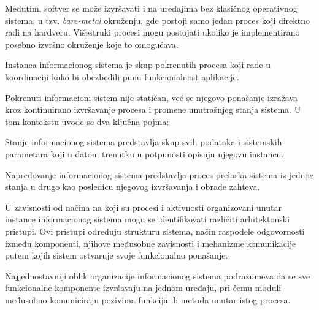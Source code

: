 Međutim, softver se može izvršavati i na uređajima bez klasičnog operativnog sistema, u tzv. \textit{bare-metal} okruženju, gde postoji samo jedan proces koji direktno radi na hardveru. Višestruki procesi mogu postojati ukoliko je implementirano posebno izvršno okruženje koje to omogućava.

\begin{definicija}
Instanca informacionog sistema je skup pokrenutih procesa koji rade u koordinaciji kako bi obezbedili punu funkcionalnost aplikacije.
\end{definicija}

Pokrenuti informacioni sistem nije statičan, već se njegovo ponašanje izražava kroz kontinuirano izvršavanje procesa i promene unutrašnjeg stanja sistema. U tom kontekstu uvode se dva ključna pojma:

\begin{definicija}
Stanje informacionog sistema predstavlja skup svih podataka i sistemskih parametara koji u datom trenutku u potpunosti opisuju njegovu instancu.
\end{definicija}

\begin{definicija}
Napredovanje informacionog sistema predstavlja proces prelaska sistema iz jednog stanja u drugo kao posledicu njegovog izvršavanja i obrade zahteva.
\end{definicija}

U zavisnosti od načina na koji su procesi i aktivnosti organizovani unutar instance informacionog sistema mogu se identifikovati različiti arhitektonski pristupi. Ovi pristupi određuju strukturu sistema, način raspodele odgovornosti između komponenti, njihove međusobne zavisnosti i mehanizme komunikacije putem kojih sistem ostvaruje svoje funkcionalno ponašanje.

Najjednostavniji oblik organizacije informacionog sistema podrazumeva da se sve funkcionalne komponente izvršavaju na jednom uređaju, pri čemu moduli međusobno komuniciraju pozivima funkcija ili metoda unutar istog procesa.

